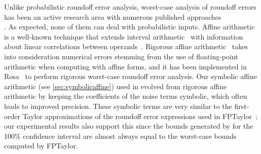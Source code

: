 %


Unlike probabilistic roundoff error analysis, worst-case analysis of roundoff errors has been an active research area
with numerous published approaches\\
\cite{gappa,gappapp,smartfloat,fluctuat,rangelab,precisa,darulova2018daisy,2015_fm_sjrg,solovyev2018rigorous,rosa,magron2017certified,pldi16-bit-level-fp-verification,zhendong2015,satire}. As expected, none of them can deal with probabilistic inputs.  Affine arithmetic~\cite{affineoriginal} is a well-known technique that extends interval arithmetic~\cite{intervalarithmetic} with information about linear correlations between operands~\cite{affinebook}.
%
Rigorous affine arithmetic~\cite{rigorousaffine} takes into consideration numerical errors stemming from the use of floating-point arithmetic when computing with affine forms, and it has been implemented in Rosa~\cite{rosa} to perform rigorous worst-case roundoff error analysis.
%
Our symbolic affine arithmetic (see \cref{sec:symbolicaffine}) used in \Tool evolved from rigorous affine arithmetic by keeping the coefficients of the noise terms symbolic, which often leads to improved precision.
%
These symbolic terms are very similar to the first-order Taylor approximations
of the roundoff error expressions used in
FPTaylor~\cite{2015_fm_sjrg,solovyev2018rigorous}; our experimental results
also support this since the bounds generated by \Tool for the 100\% confidence
interval are almost always equal to the worst-case bounds computed by FPTaylor.

